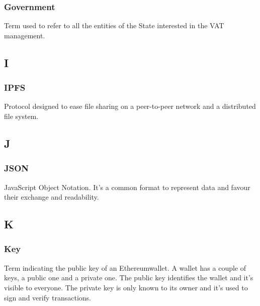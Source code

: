 \subsubsection*{Government}
Term used to refer to all the entities of the State interested in the VAT management.



\subsection*{I}

\subsubsection*{IPFS}
Protocol designed to ease file sharing on a peer-to-peer network and a distributed file system.
\subsection*{J}

\subsubsection*{JSON}
JavaScript Object Notation. It's a common format to represent data and favour their exchange and readability.



\subsection*{K}

\subsubsection*{Key}
Term indicating the public key of an Ethereum\glosp wallet\glosp. A wallet has a couple of keys, a public one and a private one. The public key identifies the wallet and it's visible to everyone. The private key is only known to its owner and it's used to sign and verify transactions.


